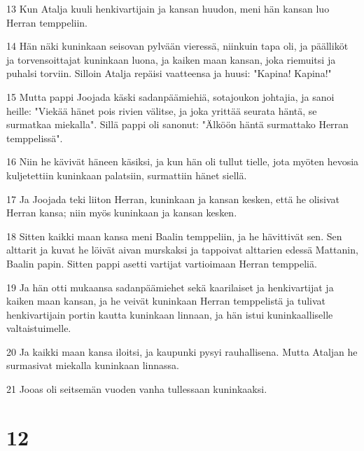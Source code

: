 \par 13 Kun Atalja kuuli henkivartijain ja kansan huudon, meni hän kansan luo Herran temppeliin.
\par 14 Hän näki kuninkaan seisovan pylvään vieressä, niinkuin tapa oli, ja päälliköt ja torvensoittajat kuninkaan luona, ja kaiken maan kansan, joka riemuitsi ja puhalsi torviin. Silloin Atalja repäisi vaatteensa ja huusi: "Kapina! Kapina!"
\par 15 Mutta pappi Joojada käski sadanpäämiehiä, sotajoukon johtajia, ja sanoi heille: "Viekää hänet pois rivien välitse, ja joka yrittää seurata häntä, se surmatkaa miekalla". Sillä pappi oli sanonut: "Älköön häntä surmattako Herran temppelissä".
\par 16 Niin he kävivät häneen käsiksi, ja kun hän oli tullut tielle, jota myöten hevosia kuljetettiin kuninkaan palatsiin, surmattiin hänet siellä.
\par 17 Ja Joojada teki liiton Herran, kuninkaan ja kansan kesken, että he olisivat Herran kansa; niin myös kuninkaan ja kansan kesken.
\par 18 Sitten kaikki maan kansa meni Baalin temppeliin, ja he hävittivät sen. Sen alttarit ja kuvat he löivät aivan murskaksi ja tappoivat alttarien edessä Mattanin, Baalin papin. Sitten pappi asetti vartijat vartioimaan Herran temppeliä.
\par 19 Ja hän otti mukaansa sadanpäämiehet sekä kaarilaiset ja henkivartijat ja kaiken maan kansan, ja he veivät kuninkaan Herran temppelistä ja tulivat henkivartijain portin kautta kuninkaan linnaan, ja hän istui kuninkaalliselle valtaistuimelle.
\par 20 Ja kaikki maan kansa iloitsi, ja kaupunki pysyi rauhallisena. Mutta Ataljan he surmasivat miekalla kuninkaan linnassa.
\par 21 Jooas oli seitsemän vuoden vanha tullessaan kuninkaaksi.

\chapter{12}

